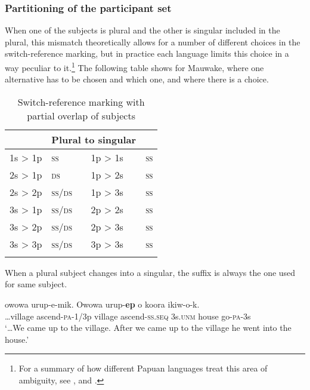 \subsubsection{Partitioning of the participant set}

When one of the subjects is plural and the other is singular included in the plural, this mismatch theoretically allows for a number of different choices in the switch-reference marking, but in practice each language limits this choice in a way peculiar to it.\footnote{For a summary of how different Papuan languages treat this area of ambiguity, see \citet{Reesink1983a}, \citet[201202]{Reesink1987} and \citet[87--91]{Roberts1988}.} The following table shows for Mauwake, where one alternative has to be chosen and which one, and where there is a choice. 



\begin{table}
\caption{Switch-reference marking with partial overlap of subjects}
\label{tab:15:switchref}
\begin{tabular}{llll}
\mytoprule
\multicolumn{2}{l}{{\bfseries Singular to plural}}
 & \multicolumn{2}{l}{{\bfseries Plural to singular}}\\
\midrule
1s  {{\textgreater}}  1p & \textsc{ss} & 1p  {{\textgreater}}  1s & \textsc{ss}\\
2s  {{\textgreater}}  1p & \textsc{ds} & 1p  {{\textgreater}}  2s & \textsc{ss}\\
2s  {{\textgreater}}  2p & \textsc{ss}/\textsc{ds} & 1p  {{\textgreater}}  3s & \textsc{ss}\\
3s  {{\textgreater}}  1p & \textsc{ss}/\textsc{ds} & 2p  {{\textgreater}}  2s & \textsc{ss}\\
3s  {{\textgreater}}  2p & \textsc{ss}/\textsc{ds} & 2p  {{\textgreater}}  3s & \textsc{ss}\\
3s  {{\textgreater}}  3p & \textsc{ss}/\textsc{ds} & 3p  {{\textgreater}}  3s & \textsc{ss}\\
\mybottomrule
\end{tabular}
\end{table}



When a plural subject changes into a singular, the suffix is always the one used for same subject. 

\ea%
\label{ex:8:x1438}
\gll {\dots}owowa  urup-e-mik.  Owowa  urup-\textbf{ep } o  koora ikiw-o-k.\\
{\dots}village  ascend-\textsc{pa}-1/3p  village  ascend-\textsc{ss}.\textsc{seq} 3s.\textsc{unm} house go-\textsc{pa}-3s\\
\glt`{\dots}We came up to the village. After we came up to the village he went into the house.'
\z



